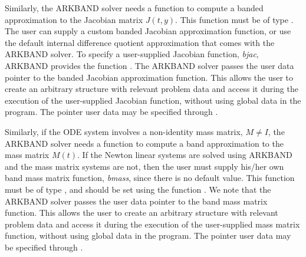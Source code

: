 \documentclass[letterpaper,10pt,english]{sphinxmanual}
\begin{document}
Similarly, the ARKBAND solver needs a function to compute a banded
approximation to the Jacobian matrix $J(t,y)$. This function
must be of type {\hyperref[c_interface/User_supplied:ARKDlsBandJacFn]{}}. The user can supply a
custom banded Jacobian approximation function, or use the default
internal difference quotient approximation that comes with the ARKBAND
solver. To specify a user-supplied Jacobian function, \emph{bjac},
ARKBAND provides the function {\hyperref[c_interface/User_callable:ARKDlsSetBandJacFn]{}}. The
ARKBAND solver passes the user data pointer to the banded Jacobian
approximation function.  This allows the user to create an arbitrary
structure with relevant problem data and access it during the
execution of the user-supplied Jacobian function, without using global
data in the program. The pointer user data may be specified through
{\hyperref[c_interface/User_callable:ARKodeSetUserData]{}}.

Similarly, if the ODE system involves a non-identity mass matrix,
$M\ne I$, the ARKBAND solver needs a function to compute a
band approximation to the mass matrix $M(t)$. If the Newton
linear systems are solved using ARKBAND and the mass matrix systems
are not, then the user must supply his/her own band mass matrix
function, \emph{bmass}, since there is no default value.  This function
must be of type {\hyperref[c_interface/User_supplied:ARKDlsBandMassFn]{}}, and should be set using
the function {\hyperref[c_interface/User_callable:ARKDlsSetBandMassFn]{}}.  We note that the
ARKBAND solver passes the user data pointer to the band mass matrix
function. This allows the user to create an arbitrary structure with
relevant problem data and access it during the execution of the
user-supplied mass matrix function, without using global data in the
program. The pointer user data may be specified through
{\hyperref[c_interface/User_callable:ARKodeSetUserData]{}}.
\end{document}
